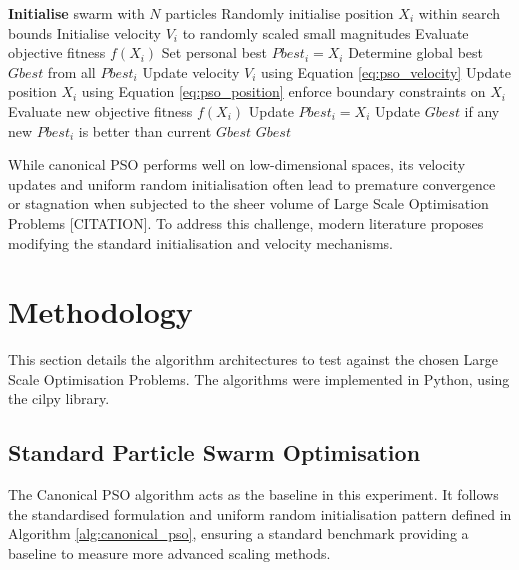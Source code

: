 \documentclass[conference]{IEEEtran}
\begin{document}
    \begin{algorithm}[H]
    \caption{Canonical Particle Swarm Optimisation}
    \label{alg:canonical_pso}
    \begin{algorithmic}[1] %
    \STATE \textbf{Initialise} swarm with $N$ particles
        \STATE Randomly initialise position $X_i$ within search bounds
        \STATE Initialise velocity $V_i$ to randomly scaled small magnitudes
        \STATE Evaluate objective fitness $f(X_i)$
        \STATE Set personal best $Pbest_i = X_i$
    \ENDFOR
    \STATE Determine global best $Gbest$ from all $Pbest_i$
            \STATE Update velocity $V_i$ using Equation \ref{eq:pso_velocity}
            \STATE Update position $X_i$ using Equation \ref{eq:pso_position}
            \STATE enforce boundary constraints on $X_i$
            \STATE Evaluate new objective fitness $f(X_i)$
                \STATE Update $Pbest_i = X_i$
            \ENDIF
        \ENDFOR
        \STATE Update $Gbest$ if any new $Pbest_i$ is better than current $Gbest$
    \ENDWHILE
    \RETURN $Gbest$
    \end{algorithmic}
    \end{algorithm}

    While canonical PSO performs well on low-dimensional spaces, its velocity updates and uniform random initialisation often lead to premature 
    convergence or stagnation when subjected to the sheer volume of Large Scale Optimisation Problems [CITATION]. To address this challenge, modern 
    literature proposes modifying the standard initialisation and velocity mechanisms. 
\section{Methodology}
    This section details the algorithm architectures to test against the chosen 
    Large Scale Optimisation Problems. The algorithms were implemented in Python, using the cilpy 
    library. 

\subsection{Standard Particle Swarm Optimisation}
    The Canonical PSO algorithm acts as the baseline in this experiment. It follows the standardised formulation 
    and uniform random initialisation pattern defined in Algorithm \ref{alg:canonical_pso}, ensuring a standard benchmark 
    providing a baseline to measure more advanced scaling methods.
\end{document}
